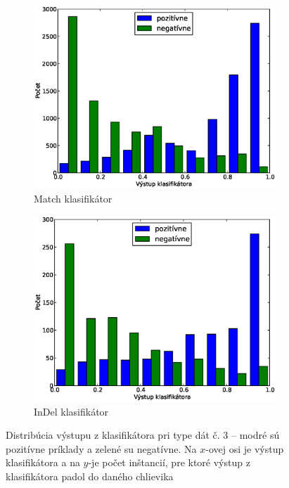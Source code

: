 \begin{figure}[htp]
        \centering
        \begin{subfigure}[t]{0.4\textwidth}
                \includegraphics[width=\textwidth]{images/clf_fi/randomforest_fullcmp_5_test}
                \caption{Match klasifikátor}
                \label{fig:datatype3-out-m}
        \end{subfigure}%
        \qquad\qquad %
        \begin{subfigure}[t]{0.4\textwidth}
                \includegraphics[width=\textwidth]{images/clf_fi/randomforest_fullcmp_5_indel_test}
                \caption{InDel klasifikátor}
                \label{fig:datatype3-out-i}
        \end{subfigure}
        \caption[Distribúcia výstupu z klasifikátora pri type dát č. 3]{Distribúcia výstupu z klasifikátora pri type dát č. 3 -- modré sú pozitívne príklady a zelené su negatívne. Na $x$-ovej osi je výstup klasifikátora a na $y$-je počet inštancií, pre ktoré výstup z klasifikátora padol do daného chlievika}
        \label{fig:datatype3-out}
\end{figure}

